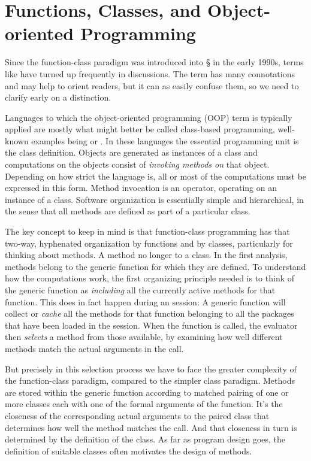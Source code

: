 \documentclass[11pt]{article}
\begin{document}
\section{Functions, Classes, and Object-oriented Programming}
\label{sec:funct-class-object}

Since the function-class paradigm was introduced into \S{} in the early 1990s, terms like  have turned up frequently in discussions.
The term has many connotations and may help to orient readers, but it can as easily confuse them, so we need to clarify early on a distinction.

Languages to which the object-oriented programming (OOP) term is typically applied are mostly what might better be called class-based programming, well-known examples being \Cpp{} or \Java{}.
In these languages the essential programming unit is the class definition.
Objects are generated as instances of a class and computations on the objects consist of \emph{invoking methods on}  that object.
Depending on how strict the language is, all or most of the computations must be expressed in this form.
Method invocation is an operator, operating on an instance of a class.
Software organization is essentially simple and  hierarchical, in the sense that all methods are defined as part of a particular class.

The key concept to keep in mind is that function-class programming has that two-way,  hyphenated organization by functions and by classes, particularly for thinking about methods.
A method no longer  to a class.
In the first analysis, methods belong to the generic function for which they are defined.
To understand how the computations work, the first organizing principle needed is to think of the generic function as \emph{including} all the currently active methods for that function.
This does in fact happen during an \R{} session:  A generic function will collect or \emph{cache} all the methods for that function belonging to all the \R{} packages that have been loaded in the session.
When the function is called, the \R{} evaluator then \emph{selects} a method from those available, by examining how well different methods match the actual arguments in the call.

But precisely in this selection process we have to face the greater complexity of the function-class paradigm, compared to the simpler class paradigm.
Methods are stored within the generic function according to matched pairing of one or more classes each with one of the formal arguments of the function.
It's the closeness of the corresponding actual arguments to the paired class that determines how well the method matches the call.
And that closeness in turn is determined by the definition of the class.
As far as program design goes, the definition of suitable classes often motivates the design of methods.
\end{document}

